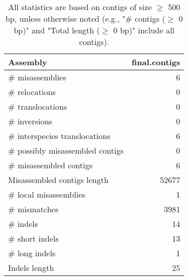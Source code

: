 \documentclass[12pt,a4paper]{article}
\begin{document}
\begin{table}[ht]
\begin{center}
\caption{All statistics are based on contigs of size $\geq$ 500 bp, unless otherwise noted (e.g., "\# contigs ($\geq$ 0 bp)" and "Total length ($\geq$ 0 bp)" include all contigs).}
\begin{tabular}{|l*{1}{|r}|}
\hline
Assembly & final.contigs \\ \hline
\# misassemblies & 6 \\ \hline
\hspace{5mm}\# relocations & 0 \\ \hline
\hspace{5mm}\# translocations & 0 \\ \hline
\hspace{5mm}\# inversions & 0 \\ \hline
\hspace{5mm}\# interspecies translocations & 6 \\ \hline
\# possibly misassembled contigs & 0 \\ \hline
\# misassembled contigs & 6 \\ \hline
Misassembled contigs length & 52677 \\ \hline
\# local misassemblies & 1 \\ \hline
\# mismatches & 3981 \\ \hline
\# indels & 14 \\ \hline
\hspace{5mm}\# short indels & 13 \\ \hline
\hspace{5mm}\# long indels & 1 \\ \hline
Indels length & 25 \\ \hline
\end{tabular}
\end{center}
\end{table}
\end{document}
